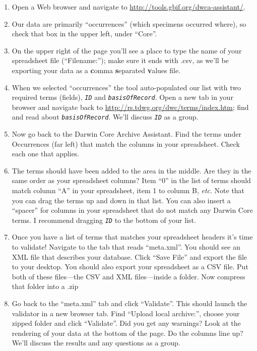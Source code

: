 \documentclass[letterpaper, 11pt]{article}
\newcommand{\latinword}[1]{\texttt{\itshape #1}}%
\begin{document}
\begin{enumerate}
\item Open a Web browser and navigate to \url{http://tools.gbif.org/dwca-assistant/}.
\item Our data are primarily ``occurrences'' (which specimens occurred where), so check that box in the upper left, under ``Core''.
\item On the upper right of the page you'll see a place to type the name of your spreadsheet file (``Filename:''); make sure it ends with .csv, as we'll be exporting your data as a \textbf{c}omma \textbf{s}eparated \textbf{v}alues file.
\item When we selected ``occurrences'' the tool auto-populated our list with two required terms (fields), \latinword{ID} and \latinword{basisOfRecord}. Open a new tab in your browser and navigate back to \url{http://rs.tdwg.org/dwc/terms/index.htm}; find and read about \latinword{basisOfRecord}. We'll discuss \latinword{ID} as a group.
\item Now go back to the Darwin Core Archive Assistant. Find the terms under Occurrences (far left) that match the columns in your spreadsheet. Check each one that applies.
\item The terms should have been added to the area in the middle. Are they in the same order as your spreadsheet columns? Item ``0'' in the list of terms should match column ``A'' in your spreadsheet, item 1 to column B, \textit{etc}. Note that you can drag the terms up and down in that list. You can also insert a ``spacer'' for columns in your spreadsheet that do not match any Darwin Core terms. I recommend dragging \latinword{ID} to the bottom of your list.
\item Once you have a list of terms that matches your spreadsheet headers it's time to validate! Navigate to the tab that reads ``meta.xml''. You should see an XML file that describes your database. Click ``Save File'' and export the file to your desktop. You should also export your spreadsheet as a CSV file. Put both of these files---the CSV and XML files---inside a folder. Now compress that folder into a .zip
\item Go back to the ``meta.xml'' tab and click ``Validate''. This should launch the validator in a new browser tab. Find ``Upload local archive:'', choose your zipped folder and click ``Validate''. Did you get any warnings? Look at the rendering of your data at the bottom of the page. Do the columns line up? We'll discuss the results and any questions as a group.
\end{enumerate}
\end{document}
